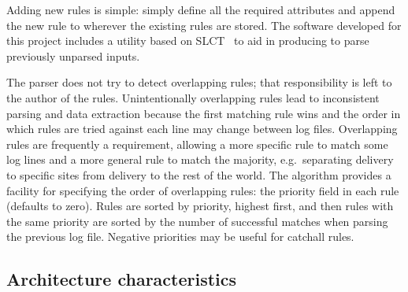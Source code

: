 \documentclass[draft]{svmult}
\begin{document}
Adding new rules is simple: simply define all the required attributes and
append the new rule to wherever the existing rules are stored.  The
software developed for this project includes a utility based on
SLCT~\cite{slct-paper} to aid in producing \regexes{} to parse previously
unparsed inputs.

\label{overlapping rules}


The parser does not try to detect overlapping rules; that responsibility is
left to the author of the rules.  Unintentionally overlapping rules lead to
inconsistent parsing and data extraction because the first matching rule
wins and the order in which rules are tried against each line may change
between log files.  Overlapping rules are frequently a requirement,
allowing a more specific rule to match some log lines and a more general
rule to match the majority, e.g.\ separating \SMTP{} delivery to specific
sites from \SMTP{} delivery to the rest of the world.  The algorithm
provides a facility for specifying the order of overlapping rules: the
priority field in each rule (defaults to zero).  Rules are sorted by
priority, highest first, and then rules with the same priority are sorted
by the number of successful matches when parsing the previous log file.
Negative priorities may be useful for catchall rules.



\subsection{Architecture characteristics}

\label{Architecture characteristics}
\end{document}
